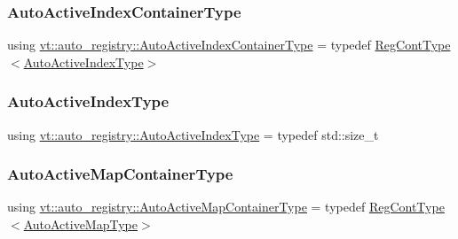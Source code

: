 \mbox{\label{namespacevt_1_1auto__registry_a892918ae7bc486701964f7e5e0bb0c8a}} 
\subsubsection{\texorpdfstring{Auto\+Active\+Index\+Container\+Type}{AutoActiveIndexContainerType}}
{\footnotesize\ttfamily using \hyperlink{namespacevt_1_1auto__registry_a892918ae7bc486701964f7e5e0bb0c8a}{vt\+::auto\+\_\+registry\+::\+Auto\+Active\+Index\+Container\+Type} = typedef \hyperlink{namespacevt_1_1auto__registry_a988a4943e4c8fe82b56f5b13bddceb2b}{Reg\+Cont\+Type}$<$\hyperlink{namespacevt_1_1auto__registry_ad5ff1c3344b954a1e1212c72c74e4a7a}{Auto\+Active\+Index\+Type}$>$}

\mbox{\label{namespacevt_1_1auto__registry_ad5ff1c3344b954a1e1212c72c74e4a7a}} 
\subsubsection{\texorpdfstring{Auto\+Active\+Index\+Type}{AutoActiveIndexType}}
{\footnotesize\ttfamily using \hyperlink{namespacevt_1_1auto__registry_ad5ff1c3344b954a1e1212c72c74e4a7a}{vt\+::auto\+\_\+registry\+::\+Auto\+Active\+Index\+Type} = typedef std\+::size\+\_\+t}

\mbox{\label{namespacevt_1_1auto__registry_a9c5b8f15bca7b0ca4d56cae7c9f85d12}} 
\subsubsection{\texorpdfstring{Auto\+Active\+Map\+Container\+Type}{AutoActiveMapContainerType}}
{\footnotesize\ttfamily using \hyperlink{namespacevt_1_1auto__registry_a9c5b8f15bca7b0ca4d56cae7c9f85d12}{vt\+::auto\+\_\+registry\+::\+Auto\+Active\+Map\+Container\+Type} = typedef \hyperlink{namespacevt_1_1auto__registry_a988a4943e4c8fe82b56f5b13bddceb2b}{Reg\+Cont\+Type}$<$\hyperlink{namespacevt_1_1auto__registry_ae1bc8f9afc86cc589761fbbf22064601}{Auto\+Active\+Map\+Type}$>$}

